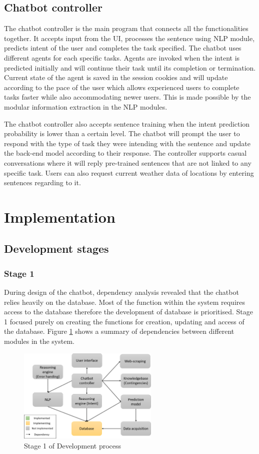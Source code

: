\documentclass[11pt]{article}
\begin{document}
\subsection{Chatbot controller} 
The chatbot controller is the main program that connects all the functionalities together. It accepts input from the UI, processes the sentence using NLP module, predicts intent of the user and completes the task specified. The chatbot uses different agents for each specific tasks. Agents are invoked when the intent is predicted initially and will continue their task until its completion or termination. Current state of the agent is saved in the session cookies and will update according to the pace of the user which allows experienced users to complete tasks faster while also accommodating newer users. This is made possible by the modular information extraction in the NLP modules.

The chatbot controller also accepts sentence training when the intent prediction probability is lower than a certain level. The chatbot will prompt the user to respond with the type of task they were intending with the sentence and update the back-end model according to their response. The controller supports casual conversations where it will reply pre-trained sentences that are not linked to any specific task. Users can also request current weather data of locations by entering sentences regarding to it.

\section{Implementation}
\subsection{Development stages} \label{Dev. stages}
\subsubsection{Stage 1}
During design of the chatbot, dependency analysis revealed that the chatbot relies heavily on the database. Most of the function within the system requires access to the database therefore the development of database is prioritised. Stage 1 focused purely on creating the functions for creation, updating and access of the database. Figure \ref{fig:Stage 1} shows a summary of dependencies between different modules in the system.
\begin{figure}[!htb]
	\centering
	\includegraphics[width=0.6\textwidth]{Stage_1}
	\caption{Stage 1 of Development process }\label{fig:Stage 1}
\end{figure}
\end{document}

